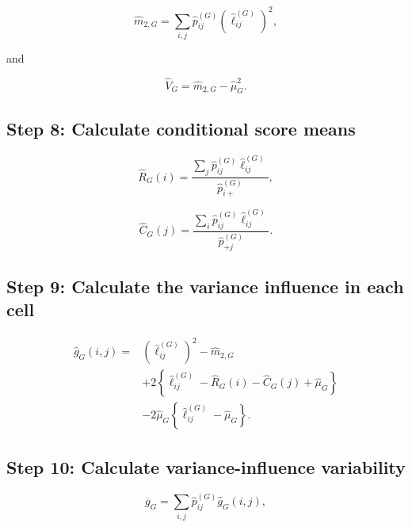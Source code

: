 \documentclass[
  11pt]{article}
\begin{document}
\begin{equation}
\widehat m_{2,G}
=\sum_{i,j}\widehat p^{(G)}_{ij}
\left(\widehat\ell^{(G)}_{ij}\right)^2,
\end{equation}

and

\begin{equation}
\widehat V_G
=\widehat m_{2,G}-\widehat\mu_G^2.
\end{equation}

\subsection{Step 8: Calculate conditional score
means}\label{step-8-calculate-conditional-score-means}

\begin{equation}
\widehat R_G(i)
=\frac{\sum_j\widehat p^{(G)}_{ij}
\widehat\ell^{(G)}_{ij}}
{\widehat p^{(G)}_{i+}},
\end{equation}

\begin{equation}
\widehat C_G(j)
=\frac{\sum_i\widehat p^{(G)}_{ij}
\widehat\ell^{(G)}_{ij}}
{\widehat p^{(G)}_{+j}}.
\end{equation}

\subsection{Step 9: Calculate the variance influence in each
cell}\label{step-9-calculate-the-variance-influence-in-each-cell}

\begin{equation}
\begin{aligned}
\widehat g_G(i,j)={}&
\left(\widehat\ell^{(G)}_{ij}\right)^2
-\widehat m_{2,G}\\
&+2\left\{
\widehat\ell^{(G)}_{ij}
-\widehat R_G(i)-\widehat C_G(j)+\widehat\mu_G
\right\}\\
&-2\widehat\mu_G
\left\{\widehat\ell^{(G)}_{ij}-\widehat\mu_G\right\}.
\end{aligned}
\end{equation}

\subsection{Step 10: Calculate variance-influence
variability}\label{step-10-calculate-variance-influence-variability}

\begin{equation}
\overline g_G
=\sum_{i,j}\widehat p^{(G)}_{ij}\widehat g_G(i,j),
\end{equation}
\end{document}
